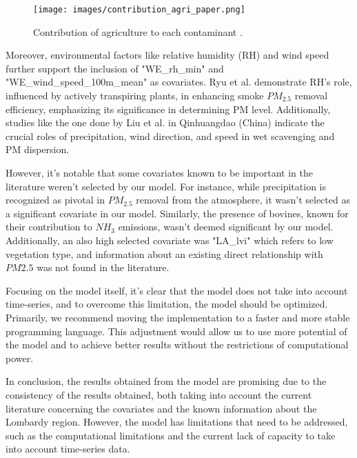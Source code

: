\documentclass[11pt,a4paper]{article}
\begin{document}
\begin{figure}[H]
    \centering
    \texttt{[image: images/contribution\_agri\_paper.png]}
    \caption{Contribution of agriculture to each contaminant \cite{ERISMAN20083209}.}
    \label{fig:agri_paper}
\end{figure}

Moreover, environmental factors like relative humidity (RH) and wind speed further support the inclusion of "WE\_rh\_min" and "WE\_wind\_speed\_100m\_mean" as covariates. Ryu et al. \cite{RYU2019253} demonstrate RH's role, influenced by actively transpiring plants, in enhancing smoke $PM_{2.5}$ removal efficiency, emphasizing its significance in determining PM level. Additionally, studies like the one done by Liu et al. \cite{liu2020analysis} in Qinhuangdao (China) indicate the crucial roles of precipitation, wind direction, and speed in wet scavenging and PM dispersion.

However, it's notable that some covariates known to be important in the literature weren't selected by our model. For instance, while precipitation is recognized as pivotal in $PM_{2.5}$ removal from the atmosphere, it wasn't selected as a significant covariate in our model. Similarly, the presence of bovines, known for their contribution to $NH_{3}$ emissions, wasn't deemed significant by our model. Additionally, an also high selected covariate was "LA\_lvi" which refers to low vegetation type, and information about an existing direct relationship with $PM2.5$ was not found in the literature.

Focusing on the model itself, it's clear that the model does not take into account time-series, and to overcome this limitation, the model should be optimized. Primarily, we recommend moving the implementation to a faster and more stable programming language. This adjustment would allow us to use more potential of the model and to achieve better results without the restrictions of computational power.

In conclusion, the results obtained from the model are promising due to the consistency of the results obtained, both taking into account the current literature concerning the covariates and the known information about the Lombardy region. However, the model has limitations that need to be addressed, such as the computational limitations and the current lack of capacity to take into account time-series data.
\end{document}
